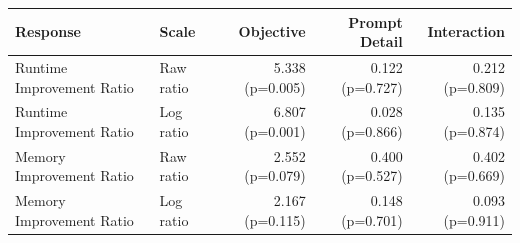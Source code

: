 \begin{tabular}{llrrr}
\toprule
Response & Scale & Objective & Prompt Detail & Interaction \\
\midrule
Runtime Improvement Ratio & Raw ratio & 5.338 (p=0.005) & 0.122 (p=0.727) & 0.212 (p=0.809) \\
Runtime Improvement Ratio & Log ratio & 6.807 (p=0.001) & 0.028 (p=0.866) & 0.135 (p=0.874) \\
Memory Improvement Ratio & Raw ratio & 2.552 (p=0.079) & 0.400 (p=0.527) & 0.402 (p=0.669) \\
Memory Improvement Ratio & Log ratio & 2.167 (p=0.115) & 0.148 (p=0.701) & 0.093 (p=0.911) \\
\bottomrule
\end{tabular}
